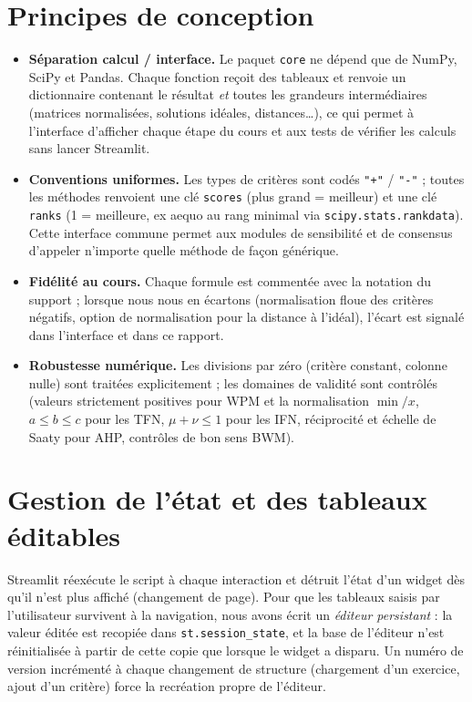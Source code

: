 \documentclass[11pt,a4paper]{report}
\theoremstyle{definition}
\theoremstyle{remark}
\begin{document}
\section{Principes de conception}

\begin{itemize}
  \item \textbf{Séparation calcul / interface.} Le paquet \texttt{core} ne dépend que de NumPy, SciPy et
        Pandas. Chaque fonction reçoit des tableaux et renvoie un dictionnaire contenant le résultat
        \emph{et} toutes les grandeurs intermédiaires (matrices normalisées, solutions idéales,
        distances\dots), ce qui permet à l'interface d'afficher chaque étape du cours et aux tests de
        vérifier les calculs sans lancer Streamlit.
  \item \textbf{Conventions uniformes.} Les types de critères sont codés \texttt{"+"} / \texttt{"-"} ;
        toutes les méthodes renvoient une clé \texttt{scores} (plus grand = meilleur) et une clé
        \texttt{ranks} (1 = meilleure, ex aequo au rang minimal via \texttt{scipy.stats.rankdata}). Cette
        interface commune permet aux modules de sensibilité et de consensus d'appeler n'importe quelle
        méthode de façon générique.
  \item \textbf{Fidélité au cours.} Chaque formule est commentée avec la notation du support ; lorsque
        nous nous en écartons (normalisation floue des critères négatifs, option de normalisation pour la
        distance à l'idéal), l'écart est signalé dans l'interface et dans ce rapport.
  \item \textbf{Robustesse numérique.} Les divisions par zéro (critère constant, colonne nulle) sont
        traitées explicitement ; les domaines de validité sont contrôlés (valeurs strictement positives
        pour WPM et la normalisation $\min/x$, $a\le b\le c$ pour les TFN, $\mu+\nu\le1$ pour les IFN,
        réciprocité et échelle de Saaty pour AHP, contrôles de bon sens BWM).
\end{itemize}

\section{Gestion de l'état et des tableaux éditables}

Streamlit réexécute le script à chaque interaction et détruit l'état d'un widget dès qu'il n'est plus
affiché (changement de page). Pour que les tableaux saisis par l'utilisateur survivent à la navigation, nous
avons écrit un \emph{éditeur persistant} : la valeur éditée est recopiée dans \texttt{st.session\_state},
et la base de l'éditeur n'est réinitialisée à partir de cette copie que lorsque le widget a disparu. Un
numéro de version incrémenté à chaque changement de structure (chargement d'un exercice, ajout d'un
critère) force la recréation propre de l'éditeur.
\end{document}
